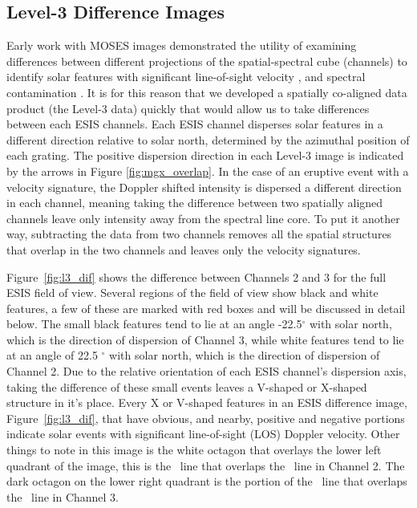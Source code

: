     \subsection{Level-3 Difference Images} \label{sec:dif_images}
    	Early work with MOSES images demonstrated the utility of examining differences between different projections of the spatial-spectral cube (channels) to identify solar features with significant line-of-sight velocity \citep{Fox10,FoxPhD,RustPhD,Rust2019}, and spectral contamination \citep{RustPhD, Rust2019,Parker2021}.
    	It is for this reason that we developed a spatially co-aligned data product (the Level-3 data) quickly that would allow us to take differences between each ESIS channels.
    	Each ESIS channel disperses solar features in a different direction relative to solar north, determined by the azimuthal position of each grating.
    	The positive dispersion direction in each Level-3 image is indicated by the arrows  in Figure \ref{fig:mgx_overlap}.
    	In the case of an eruptive event with a velocity signature, the Doppler shifted intensity is dispersed a different direction in each channel, meaning taking the difference between two spatially aligned channels leave only intensity away from the spectral line core.  
    	To put it another way, subtracting the data from two channels removes all the spatial structures that overlap in the two channels and leaves only the velocity signatures. 
    	
    	Figure~\ref{fig:l3_dif} shows the difference between Channels 2 and 3 for the full ESIS field of view.  
    	Several regions of the field of view show black and white features, a few of these are marked with red boxes and will be discussed in detail below.  
    	The small black features tend to lie at an angle -22.5$^\circ$ with solar north, which is the direction of dispersion of Channel 3, while white features tend to lie at an angle of 22.5 $^\circ$ with solar north, which is the direction of dispersion of Channel 2.  
    	Due to the relative orientation of each ESIS channel's dispersion axis, taking the difference of these small events leaves a V-shaped or X-shaped structure in it's place.  
    	Every X or V-shaped features in an ESIS difference image, Figure~\ref{fig:l3_dif}, that have obvious, and nearby, positive and negative portions indicate solar events with significant line-of-sight (LOS) Doppler velocity.   
    	Other things to note in this image is the white octagon that overlays the lower left quadrant of the image, this is the \mgxbright \ line that overlaps the \ov \ line in Channel 2.  The dark octagon on the lower right quadrant is the portion of the \mgxbright \ line that overlaps the \ov \ line in Channel 3.    
   		

